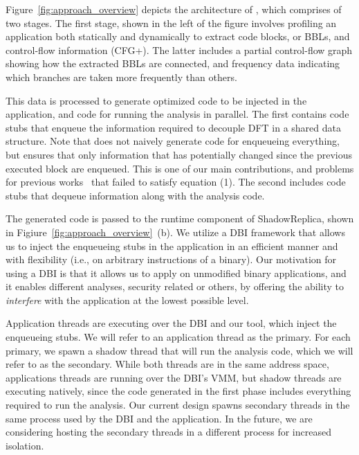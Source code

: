 Figure~\ref{fig:approach_overview} depicts the architecture of \sreplica, which
comprises of two stages. The first stage, shown in the left of the figure
involves profiling an application both statically and dynamically to extract
code blocks, or BBLs, and control-flow information (CFG+). The latter includes
a partial control-flow graph showing how the extracted BBLs are connected, and
frequency data indicating which branches are taken more frequently than others.

This data is processed to generate optimized code to be injected in the
application, and code for running the analysis in parallel. The first contains
code stubs that enqueue the information required to decouple DFT in a shared
data structure. Note that \sreplica does not naively generate code for
enqueueing everything, but ensures that only information that has potentially
changed since the previous executed block are enqueued. This is one of our main
contributions, and problems for previous works~\cite{speck:asplos2008,
superpin:cgo2007, pipa:cgo2008} that failed to satisfy equation (1). The second
includes code stubs that dequeue information along with the analysis code.

The generated code is passed to the runtime component of ShadowReplica, shown
in Figiure~\ref{fig:approach_overview}~(b). We utilize a DBI framework that
allows us to inject the enqueueing stubs in the application in an efficient
manner and with flexibility (i.e., on arbitrary instructions of a binary). Our
motivation for using a DBI is that it allows us to apply \sreplica on
unmodified binary applications, and it enables different analyses, security
related or others, by offering the ability to {\it interfere} with the application
at the lowest possible level.

Application threads are executing over the DBI and our tool, which inject the
enqueueing stubs. We will refer to an application thread as the primary. For
each primary, we spawn a shadow thread that will run the analysis code, which
we will refer to as the secondary. While both threads are in the same address
space, applications threads are running over the DBI’s VMM, but shadow threads
are executing natively, since the code generated in the first phase includes
everything required to run the analysis. Our current design spawns secondary
threads in the same process used by the DBI and the application. In the future,
we are considering hosting the secondary threads in a different process for
increased isolation.

